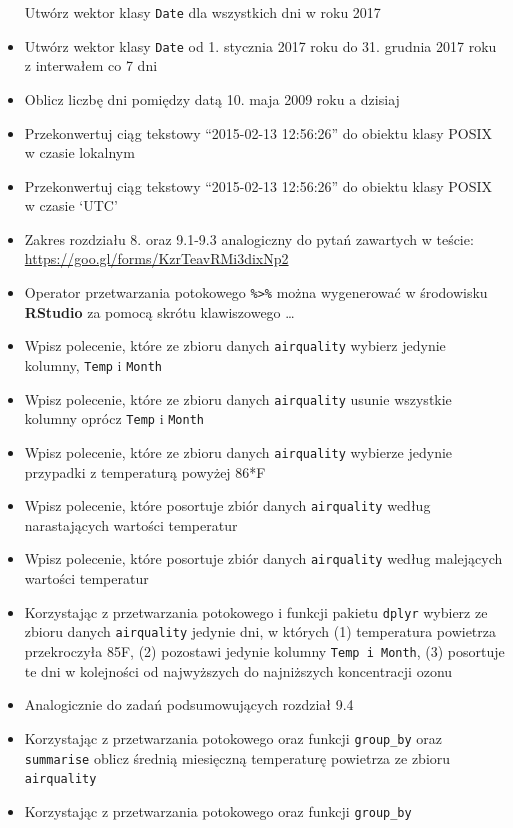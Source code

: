 \documentclass[]{book}
\theoremstyle{definition}
\theoremstyle{definition}
\theoremstyle{definition}
\theoremstyle{remark}
\begin{document}
\begin{itemize}
  Utwórz wektor klasy \texttt{Date} dla wszystkich dni w roku 2017
\item
  Utwórz wektor klasy \texttt{Date} od 1. stycznia 2017 roku do 31.
  grudnia 2017 roku z interwałem co 7 dni
\item
  Oblicz liczbę dni pomiędzy datą 10. maja 2009 roku a dzisiaj
\item
  Przekonwertuj ciąg tekstowy ``2015-02-13 12:56:26'' do obiektu klasy
  POSIX w czasie lokalnym
\item
  Przekonwertuj ciąg tekstowy ``2015-02-13 12:56:26'' do obiektu klasy
  POSIX w czasie `UTC'
\item
  Zakres rozdziału 8. oraz 9.1-9.3 analogiczny do pytań zawartych w
  teście: \url{https://goo.gl/forms/KzrTeavRMi3dixNp2}
\item
  Operator przetwarzania potokowego \texttt{\%\textgreater{}\%} można
  wygenerować w środowisku \textbf{RStudio} za pomocą skrótu
  klawiszowego \ldots{}
\item
  Wpisz polecenie, które ze zbioru danych \texttt{airquality} wybierz
  jedynie kolumny, \texttt{Temp} i \texttt{Month}
\item
  Wpisz polecenie, które ze zbioru danych \texttt{airquality} usunie
  wszystkie kolumny oprócz \texttt{Temp} i \texttt{Month}
\item
  Wpisz polecenie, które ze zbioru danych \texttt{airquality} wybierze
  jedynie przypadki z temperaturą powyżej 86*F
\item
  Wpisz polecenie, które posortuje zbiór danych \texttt{airquality}
  według narastających wartości temperatur
\item
  Wpisz polecenie, które posortuje zbiór danych \texttt{airquality}
  według malejących wartości temperatur
\item
  Korzystając z przetwarzania potokowego i funkcji pakietu
  \texttt{dplyr} wybierz ze zbioru danych \texttt{airquality} jedynie
  dni, w których (1) temperatura powietrza przekroczyła 85F, (2)
  pozostawi jedynie kolumny \texttt{Temp\ i\ Month}, (3) posortuje te
  dni w kolejności od najwyższych do najniższych koncentracji ozonu
\item
  Analogicznie do zadań podsumowujących rozdział 9.4
\item
  Korzystając z przetwarzania potokowego oraz funkcji \texttt{group\_by}
  oraz \texttt{summarise} oblicz średnią miesięczną temperaturę
  powietrza ze zbioru \texttt{airquality}
\item
  Korzystając z przetwarzania potokowego oraz funkcji \texttt{group\_by}

\end{itemize}
\end{document}
